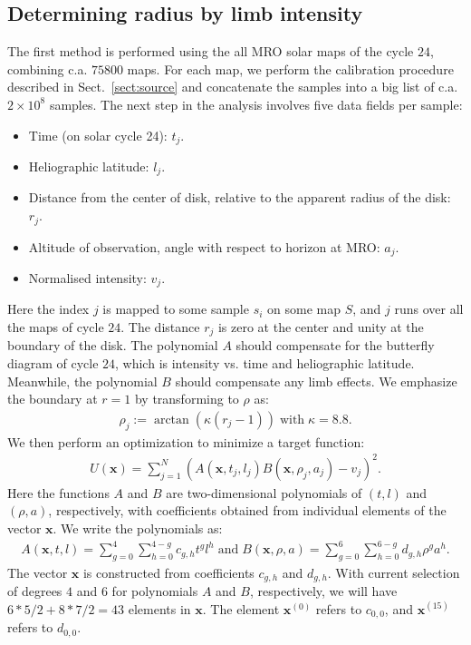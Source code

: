 \documentclass{aa}
\newcommand{\eqnl}[2]{\begin{eqnarray}\label{#1}#2\end{eqnarray}}
\begin{document}
  \subsection{Determining radius by limb intensity} \label{sect:radius_method1}

  The first method is performed using the all MRO solar maps of the cycle $24$, combining c.a. $75800$ maps. For each 
  map, we perform the calibration procedure described in Sect.~\ref{sect:source} and concatenate the samples into a 
  big list of c.a. $2 \times 10^8$ samples. The next step in the analysis involves five data fields per sample:
  \begin{itemize}
  \item Time (on solar cycle 24): $t_j$.
  \item Heliographic latitude: $l_j$.
  \item Distance from the center of disk, relative to the apparent radius of the disk: $r_j$.
  \item Altitude of observation, angle with respect to horizon at MRO: $a_j$.
  \item Normalised intensity: $v_j$.
  \end{itemize}

  Here the index $j$ is mapped to some sample $s_i$ on some map $S$, and $j$ runs over all the maps of cycle $24$. The 
  distance $r_j$ is zero at the center and unity at the boundary of the disk.
    The polynomial $A$ should compensate for the butterfly diagram of cycle $24$, which is intensity vs. time and heliographic latitude. Meanwhile, the polynomial $B$ should compensate any limb effects.
  We emphasize the boundary at $r=1$ by transforming to $\rho$ as:
  \eqnl{physical_radius_trans}{
  \rho_j := \arctan \left( \kappa \left( r_j - 1 \right)\right) \; \text{with} \; \kappa = 8.8 \text{.}
  }
  We then perform an optimization to 
  minimize a target function:
  \eqnl{physical_radius_target}{
  U(\bm{x}) = \sum \limits_{j=1}^{N} \left( A(\bm{x},t_j,l_j) B(\bm{x},\rho_j,a_j) - v_j \right)^2 \text{.}
  }
  Here the functions $A$ and $B$ are two-dimensional polynomials of $(t,l)$ and $(\rho,a)$, respectively, with coefficients obtained from individual elements of the vector $\bm{x}$. We write the polynomials as:
  \eqnl{physical_radius_polynomials}{
  A(\bm{x},t,l) = \sum \limits_{g=0}^{4} \sum \limits_{h=0}^{4-g} c_{g,h} t^g l^h \; \text{and} \;
  B(\bm{x},\rho,a) = \sum \limits_{g=0}^{6} \sum \limits_{h=0}^{6-g} d_{g,h} \rho^g a^h \text{.}
  }
  The vector $\bm{x}$ is constructed from coefficients $c_{g,h}$ and $d_{g,h}$. With current selection of degrees $4$ 
  and $6$ for polynomials $A$ and $B$, respectively, we will have $6*5/2 + 8*7/2 = 43$ elements in $\bm{x}$. The element 
  $\bm{x}^{(0)}$ refers to $c_{0,0}$, and $\bm{x}^{(15)}$ refers to $d_{0,0}$.
\end{document}
